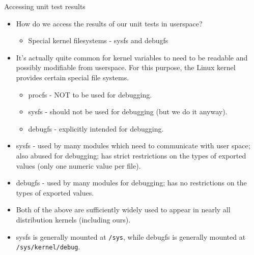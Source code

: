 \documentclass{beamer}
\begin{document}
\begin{frame}{Accessing unit test results}

  \begin{itemize}

  \item How do we access the results of our unit tests in userspace?
    \begin{itemize}
    \item Special kernel filesystems - sysfs and debugfs
    \end{itemize}

  \item It's actually quite common for kernel variables to need to be
    readable and possibly modifiable from  userspace. For this
    purpose, the Linux kernel provides certain special file systems.
    \begin{itemize}
    \item procfs - NOT to be used for debugging.
    \item sysfs - should not be used for debugging (but we do it anyway).
    \item debugfs - explicitly intended for debugging.
    \end{itemize}
  \item sysfs - used by many modules which need to communicate with
    user space; also abused for debugging; has strict restrictions on
    the types of exported values (only one numeric value per file).
  \item debugfs - used by many modules for debugging; has no
    restrictions on the types of exported values.
  \item Both of the above are sufficiently widely used to appear in
    nearly all distribution kernels (including ours).
  \item sysfs is generally mounted at \texttt{/sys}, while debugfs is
    generally mounted at \texttt{/sys/kernel/debug}.
  \end{itemize}

\end{frame}
\end{document}
